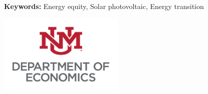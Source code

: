 \begin{titlepage}
\begin{center}
\begin{flushleft}
    \vspace{1em}
\textbf{Keywords:} Energy equity, Solar photovoltaic, Energy transition

\end{flushleft}
  \vspace{1em}

\includegraphics[width = 6cm]{figures/unm.png}






\end{center}

\end{titlepage}

